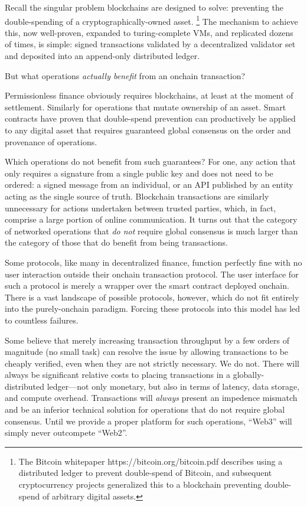\documentclass[runningheads]{llncs}
\begin{document}
Recall the singular problem blockchains are designed to solve: preventing the double-spending of a cryptographically-owned asset.
\footnote{The Bitcoin whitepaper https://bitcoin.org/bitcoin.pdf describes using a distributed ledger to prevent double-spend of Bitcoin, and subsequent cryptocurrency projects generalized this to a blockchain preventing double-spend of arbitrary digital assets.}
The mechanism to achieve this, now well-proven, expanded to turing-complete VMs, and replicated dozens of times, is simple: signed transactions validated by a decentralized validator set and deposited into an append-only distributed ledger.

But what operations \textit{actually benefit} from an onchain transaction?

Permissionless finance obviously requires blockchains, at least at the moment of settlement.
Similarly for operations that mutate ownership of an asset.
Smart contracts have proven that double-spend prevention can productively be applied to any digital asset that requires guaranteed global consensus on the order and provenance of operations.

Which operations do not benefit from such guarantees?
For one, any action that only requires a signature from a single public key and does not need to be ordered:
a signed message from an individual, or an API published by an entity acting as the single source of truth.
Blockchain transactions are similarly unnecessary for actions undertaken between trusted parties, which, in fact, comprise a large portion of online communication.
It turns out that the category of networked operations that \textit{do not} require global consensus is much larger than the category of those that do benefit from being transactions.

Some protocols, like many in decentralized finance, function perfectly fine with no user interaction outside their onchain transaction protocol.
The user interface for such a protocol is merely a wrapper over the smart contract deployed onchain.
There is a vast landscape of possible protocols, however, which do not fit entirely into the purely-onchain paradigm.
Forcing these protocols into this model has led to countless failures.

Some believe that merely increasing transaction throughput by a few orders of magnitude (no small task) can resolve the issue by allowing transactions to be cheaply verified, even when they are not strictly necessary.
We do not.
There will always be significant relative costs to placing transactions in a globally-distributed ledger—not only monetary, but also in terms of latency, data storage, and compute overhead.
Transactions will \textit{always} present an impedence mismatch and be an inferior technical solution for operations that do not require global consensus.
Until we provide a proper platform for such operations, ``Web3'' will simply never outcompete ``Web2''.
\end{document}
